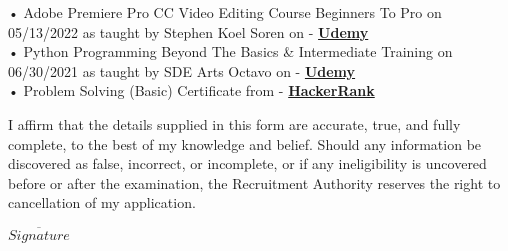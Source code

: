 \documentclass[a4paper]{article}
\begin{document}
      • Adobe Premiere Pro CC Video Editing Course Beginners To Pro on 05/13/2022 as taught by Stephen Koel Soren on - \textbf{\href{https://www.udemy.com/certificate/UC-1de79da9-00ef-4764-817e-8ad97c951d7a/}{Udemy}}\\
\vspace*{1mm}
      • Python Programming Beyond The Basics \& Intermediate Training on 06/30/2021 as taught by SDE Arts \textbar{} Octavo on - \textbf{\href{https://www.udemy.com/certificate/UC-8321220c-d281-44ff-9ad8-ff8c0b724873/}{Udemy}}\\
\vspace*{1mm}
      • Problem Solving (Basic) Certificate from - \textbf{\href{https://www.hackerrank.com/certificates/41e3022b86d5}{HackerRank}}\\
\vspace*{1mm}
      \vspace{2mm}

\vspace{3cm}
I affirm that the details supplied in this form are accurate, true, and fully complete, to the best of my knowledge and belief. Should any information be discovered as false, incorrect, or incomplete, or if any ineligibility is uncovered before or after the examination, the Recruitment Authority reserves the right to cancellation of my application.


\vspace{2cm} \hfill $\overline{Signature}$





    
\end{document}
